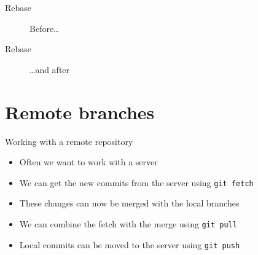 \documentclass[12pt]{beamer}
\begin{document}
\begin{frame}[fragile]{Rebase}
\begin{figure}
		\centering
		\caption{Before\ldots}

	\end{figure}
\end{frame}

\begin{frame}{Rebase}
\begin{figure}
	\centering
	\caption{\ldots and after}
	
\end{figure}
\end{frame}


\section{Remote branches}

\begin{frame}[fragile]{Working with a remote repository}
\begin{itemize}
\item Often we want to work with a server
\item We can get the new commits from the server using \texttt{git fetch}
\item These changes can now be merged with the local branches
\item We can combine the fetch with the merge using \texttt{git pull}
\item Local commits can be moved to the server using \texttt{git push}
\end{itemize}
\end{frame}
\end{document}
